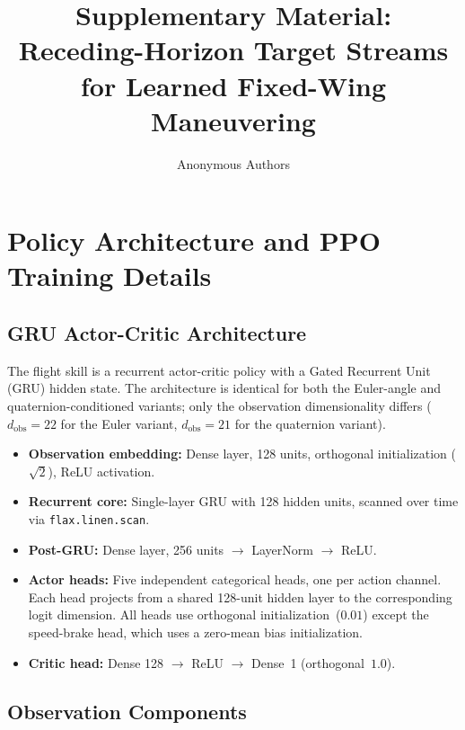 \documentclass{article}
\title{Supplementary Material: \\
       Receding-Horizon Target Streams for Learned Fixed-Wing Maneuvering}
\author{Anonymous Authors}
\begin{document}
\maketitle

\appendix
\section{Policy Architecture and PPO Training Details}
\label{app:architecture}

\subsection{GRU Actor-Critic Architecture}

The flight skill is a recurrent actor-critic policy with a Gated Recurrent Unit
(GRU) hidden state.  The architecture is identical for both the Euler-angle and
quaternion-conditioned variants; only the observation dimensionality differs
($d_{\mathrm{obs}} = 22$ for the Euler variant, $d_{\mathrm{obs}} = 21$ for the
quaternion variant).

\begin{itemize}
  \item \textbf{Observation embedding:} Dense layer, 128 units, orthogonal
        initialization ($\sqrt{2}$), ReLU activation.
  \item \textbf{Recurrent core:} Single-layer GRU with 128 hidden units,
        scanned over time via \texttt{flax.linen.scan}.
  \item \textbf{Post-GRU:} Dense layer, 256 units $\rightarrow$ LayerNorm
        $\rightarrow$ ReLU.
  \item \textbf{Actor heads:} Five independent categorical heads, one per
        action channel.  Each head projects from a shared 128-unit hidden
        layer to the corresponding logit dimension.  All heads use
        orthogonal initialization~($0.01$) except the speed-brake head, which
        uses a zero-mean bias initialization.
  \item \textbf{Critic head:} Dense 128 $\rightarrow$ ReLU $\rightarrow$
        Dense~1 (orthogonal~$1.0$).
\end{itemize}

\subsection{Observation Components}
\end{document}
